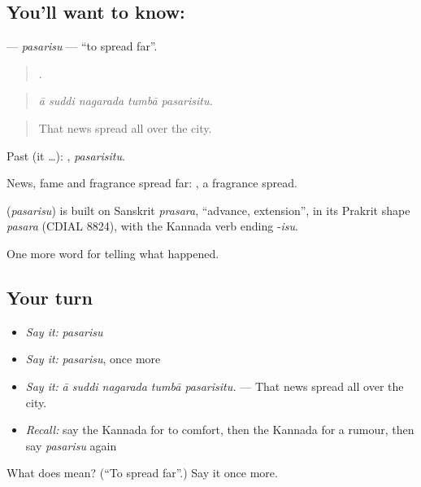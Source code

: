 \subsection*{You'll want to know: }
\textbf{} — \emph{pasarisu} — \textquotedblleft{}to spread far\textquotedblright{}.

\begin{quote}
    .
\end{quote}

\begin{quote}
\emph{ā suddi nagarada tumbā pasarisitu.}
\end{quote}

\begin{quote}
That news spread all over the city.
\end{quote}

Past (it …): , \emph{pasarisitu}.

News, fame and fragrance spread far:  , a fragrance spread.

\begin{cousinweb}
\textbf{} (\emph{pasarisu}) is built on Sanskrit \emph{prasara}, \textquotedblleft{}advance, extension\textquotedblright{}, in its Prakrit shape \emph{pasara} (CDIAL 8824), with the Kannada verb ending -\emph{isu}.
\end{cousinweb}

\begin{grammarlens}[title={What you've built}]
One more word for telling what happened.
\end{grammarlens}

\subsection*{Your turn}
\begin{itemize}
\raggedright
  \item \emph{Say it:} \emph{pasarisu}
  \item \emph{Say it:} \emph{pasarisu}, once more
  \item \emph{Say it:} \emph{ā suddi nagarada tumbā pasarisitu.} — That news spread all over the city.
  \item \emph{Recall:} say the Kannada for to comfort, then the Kannada for a rumour, then say \emph{pasarisu} again
\end{itemize}

\begin{tcolorbox}[breakable,colback=teal!4,colframe=teal!35!black,title={Before you move on}]
What does  mean? (\textquotedblleft{}To spread far\textquotedblright{}.) Say it once more.
\end{tcolorbox}
